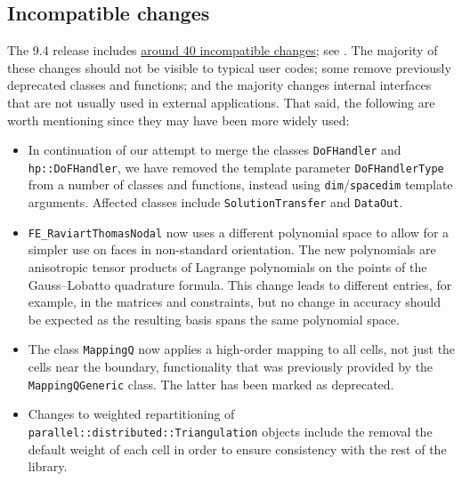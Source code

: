 \documentclass{ansarticle-preprint}
\begin{document}
\subsection{Incompatible changes}\label{subsec:deprecated}

The 9.4 release includes
\href{https://dealii.org/developer/doxygen/deal.II/changes_between_9_3_0_and_9_4_0.html}
{around 40 incompatible changes}; see \cite{changes94}. The majority of these changes
should not be visible to typical user codes; some remove previously
deprecated classes and functions; and the majority changes internal
interfaces that are not usually used in external
applications. That said, the following are worth mentioning since they
may have been more widely used:
\begin{itemize}
  \item In continuation of our attempt to merge the classes \texttt{DoFHandler} and \texttt{hp::DoFHandler}, we have removed the
  template parameter \texttt{DoFHandlerType} from a number of classes and
  functions, instead using \texttt{dim}/\texttt{spacedim} template arguments. Affected
  classes include \texttt{SolutionTransfer} and \texttt{DataOut}.
  \item \texttt{FE\_RaviartThomasNodal} now uses a different polynomial space to allow
  for a simpler use on faces in non-standard orientation. The new polynomials
  are anisotropic tensor products of Lagrange polynomials on the points of the
  Gauss--Lobatto quadrature formula. This change leads to different entries, for example, in
  the matrices and constraints, but no change in accuracy should be expected as
  the resulting basis spans the same polynomial space.
  \item The class \texttt{MappingQ} now applies a high-order mapping
    to all cells, not just the cells near the boundary, functionality
    that was previously provided by the \texttt{MappingQGeneric}
    class. The latter has been marked as deprecated.
  \item Changes to weighted repartitioning of
    \texttt{parallel::distributed::Triangulation} objects include
  the removal the default weight of each cell in order to ensure
  consistency with the rest of the library.
\end{itemize}



\end{document}
